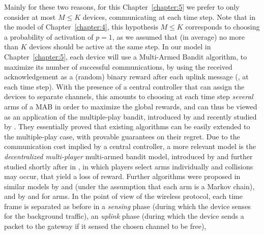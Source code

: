 Mainly for these two reasons, for this Chapter~\ref{chapter:5} we prefer to only consider at most $M \leq K$ devices, communicating at each time step.
Note that in the model of Chapter~\ref{chapter:4}, this hypothesis $M \leq K$ corresponds to choosing a probability of activation of $p=1$, as we assumed that (in average) no more than $K$ devices should be active at the same step.
%
In our model in Chapter~\ref{chapter:5}, each device will use a Multi-Armed Bandit algorithm, to maximize its number of successful communications, by using the received acknowledgement \Ack{} as a (random) binary reward after each uplink message (\ie, at each time step).
%
With the presence of a central controller that can assign the devices to separate channels, this amounts to choosing at each time step \emph{several} arms of a MAB in order to maximize the global rewards, and can thus be viewed as an application of the multiple-play bandit, introduced by \cite{Anantharam87a} and recently studied by \cite{Komiyama15}.
They essentially proved that existing algorithms can be easily extended to the multiple-play case, with provable guarantees on their regret.
%
%
Due to the communication cost implied by a central controller, a more relevant model is the
\emph{decentralized multi-player} multi-armed bandit model, introduced by \cite{Zhao10} and further studied shortly after in \cite{Anandkumar10,Anandkumar11}, in which players select arms individually and collisions may occur, that yield a loss of reward.
Further algorithms were proposed in similar models by \cite{Tekin12IEEE} and \cite{Kalathil12} (under the assumption that each arm is a Markov chain),
and by \cite{Avner15,Avner16} and \cite{Rosenski16} for \iid{} arms.
%
In the point of view of the wireless protocol, each time frame is separated as before in a \emph{sensing} phase (during which the device senses for the background traffic),
an \emph{uplink} phase (during which the device sends a packet to the gateway if it sensed the chosen channel to be free),
